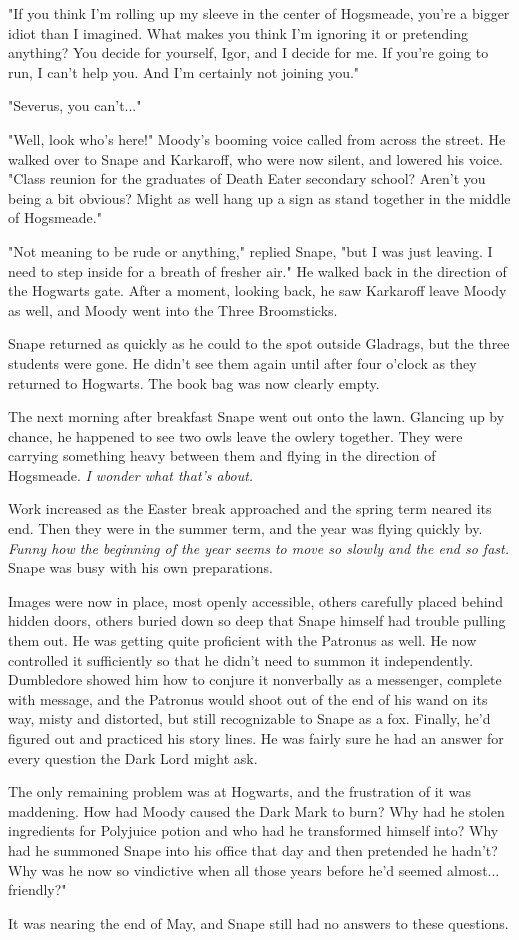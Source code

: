 "If you think I'm rolling up my sleeve in the center of Hogsmeade, you're a bigger idiot than I imagined. What makes you think I'm ignoring it or pretending anything? You decide for yourself, Igor, and I decide for me. If you're going to run, I can't help you. And I'm certainly not joining you."

"Severus, you can't..."

"Well, look who's here!" Moody's booming voice called from across the street. He walked over to Snape and Karkaroff, who were now silent, and lowered his voice. "Class reunion for the graduates of Death Eater secondary school? Aren't you being a bit obvious? Might as well hang up a sign as stand together in the middle of Hogsmeade."

"Not meaning to be rude or anything," replied Snape, "but I was just leaving. I need to step inside for a breath of fresher air." He walked back in the direction of the Hogwarts gate. After a moment, looking back, he saw Karkaroff leave Moody as well, and Moody went into the Three Broomsticks.

Snape returned as quickly as he could to the spot outside Gladrags, but the three students were gone. He didn't see them again until after four o'clock as they returned to Hogwarts. The book bag was now clearly empty.

The next morning after breakfast Snape went out onto the lawn. Glancing up by chance, he happened to see two owls leave the owlery together. They were carrying something heavy between them and flying in the direction of Hogsmeade. \emph{I wonder what that's about.}

Work increased as the Easter break approached and the spring term neared its end. Then they were in the summer term, and the year was flying quickly by. \emph{Funny how the beginning of the year seems to move so slowly and the end so fast.} Snape was busy with his own preparations.

Images were now in place, most openly accessible, others carefully placed behind hidden doors, others buried down so deep that Snape himself had trouble pulling them out. He was getting quite proficient with the Patronus as well. He now controlled it sufficiently so that he didn't need to summon it independently. Dumbledore showed him how to conjure it nonverbally as a messenger, complete with message, and the Patronus would shoot out of the end of his wand on its way, misty and distorted, but still recognizable to Snape as a fox. Finally, he'd figured out and practiced his story lines. He was fairly sure he had an answer for every question the Dark Lord might ask.

The only remaining problem was at Hogwarts, and the frustration of it was maddening. How had Moody caused the Dark Mark to burn? Why had he stolen ingredients for Polyjuice potion and who had he transformed himself into? Why had he summoned Snape into his office that day and then pretended he hadn't? Why was he now so vindictive when all those years before he'd seemed almost... friendly?"

It was nearing the end of May, and Snape still had no answers to these questions. 


